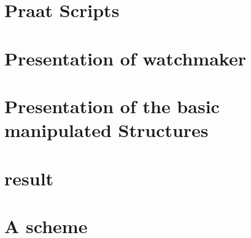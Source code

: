 \documentclass[12pt]{report}
\begin{document}
\chapter{Praat Scripts}
\chapter{Presentation of watchmaker}
\chapter{Presentation of the basic manipulated Structures}
\chapter{result}
\appendix
\chapter{A scheme}

\listoffigures
\listoftables

 
\end{document}
